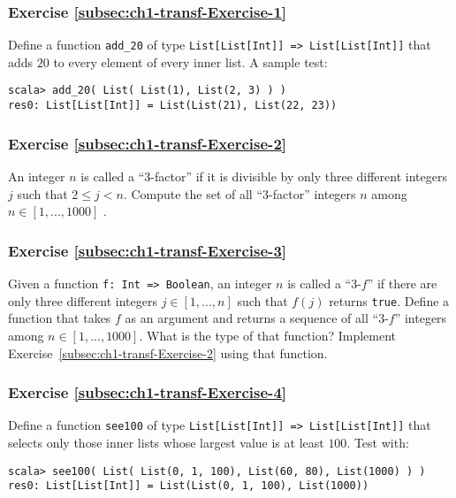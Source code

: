 \subsubsection{Exercise \label{subsec:ch1-transf-Exercise-1}\ref{subsec:ch1-transf-Exercise-1}}

Define a function \texttt{}\lstinline!add_20!
of type \texttt{}\lstinline!List[List[Int]] => List[List[Int]]!
that adds $20$ to every element of every inner list. A sample test:
\begin{lstlisting}
scala> add_20( List( List(1), List(2, 3) ) )
res0: List[List[Int]] = List(List(21), List(22, 23))
\end{lstlisting}

\subsubsection{Exercise \label{subsec:ch1-transf-Exercise-2}\ref{subsec:ch1-transf-Exercise-2}}

An integer $n$ is called a ``$3$-factor'' if it is divisible by
only three different integers $j$ such that $2\leq j<n$. Compute
the set of all ``$3$-factor'' integers $n$ among $n\in[1,...,1000]$
.

\subsubsection{Exercise \label{subsec:ch1-transf-Exercise-3}\ref{subsec:ch1-transf-Exercise-3}}

Given a function \lstinline!f: Int => Boolean!,
an integer $n$ is called a ``$3$-$f$'' if there are only three
different integers $j\in[1,...,n]$ such that $f(j)$ returns \lstinline!true!.
Define a function that takes $f$ as an argument and returns a sequence
of all ``$3$-$f$'' integers among $n\in[1,...,1000]$. What is
the type of that function? Implement Exercise~\ref{subsec:ch1-transf-Exercise-2}
using that function.

\subsubsection{Exercise \label{subsec:ch1-transf-Exercise-4}\ref{subsec:ch1-transf-Exercise-4}}

Define a function \lstinline!see100!
of type \texttt{}\lstinline!List[List[Int]] => List[List[Int]]!
that selects only those inner lists whose largest value is at least
$100$. Test with:
\begin{lstlisting}
scala> see100( List( List(0, 1, 100), List(60, 80), List(1000) ) )
res0: List[List[Int]] = List(List(0, 1, 100), List(1000))
\end{lstlisting}

